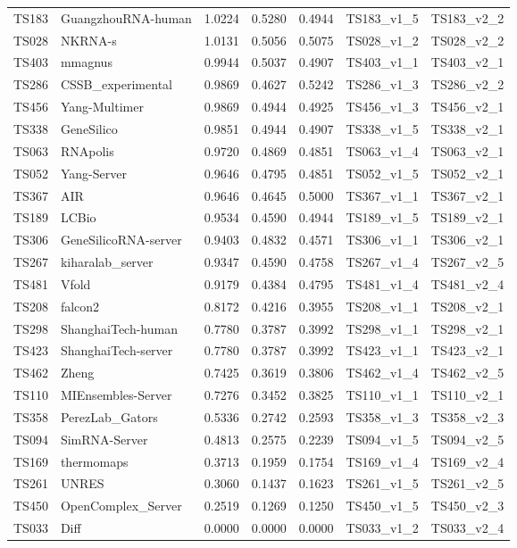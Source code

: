 \begin{table}[ht]
{\begin{tabular}{llrrrll}
TS183 & GuangzhouRNA-human & 1.0224 & 0.5280 & 0.4944 & TS183\_v1\_5 & TS183\_v2\_2 \\ 
TS028 & NKRNA-s & 1.0131 & 0.5056 & 0.5075 & TS028\_v1\_2 & TS028\_v2\_2 \\ 
TS403 & mmagnus & 0.9944 & 0.5037 & 0.4907 & TS403\_v1\_1 & TS403\_v2\_1 \\ 
TS286 & CSSB\_experimental & 0.9869 & 0.4627 & 0.5242 & TS286\_v1\_3 & TS286\_v2\_2 \\ 
TS456 & Yang-Multimer & 0.9869 & 0.4944 & 0.4925 & TS456\_v1\_3 & TS456\_v2\_1 \\ 
TS338 & GeneSilico & 0.9851 & 0.4944 & 0.4907 & TS338\_v1\_5 & TS338\_v2\_1 \\ 
TS063 & RNApolis & 0.9720 & 0.4869 & 0.4851 & TS063\_v1\_4 & TS063\_v2\_1 \\ 
TS052 & Yang-Server & 0.9646 & 0.4795 & 0.4851 & TS052\_v1\_5 & TS052\_v2\_1 \\ 
TS367 & AIR & 0.9646 & 0.4645 & 0.5000 & TS367\_v1\_1 & TS367\_v2\_1 \\ 
TS189 & LCBio & 0.9534 & 0.4590 & 0.4944 & TS189\_v1\_5 & TS189\_v2\_1 \\ 
TS306 & GeneSilicoRNA-server & 0.9403 & 0.4832 & 0.4571 & TS306\_v1\_1 & TS306\_v2\_1 \\ 
TS267 & kiharalab\_server & 0.9347 & 0.4590 & 0.4758 & TS267\_v1\_4 & TS267\_v2\_5 \\ 
TS481 & Vfold & 0.9179 & 0.4384 & 0.4795 & TS481\_v1\_4 & TS481\_v2\_4 \\ 
TS208 & falcon2 & 0.8172 & 0.4216 & 0.3955 & TS208\_v1\_1 & TS208\_v2\_1 \\ 
TS298 & ShanghaiTech-human & 0.7780 & 0.3787 & 0.3992 & TS298\_v1\_1 & TS298\_v2\_1 \\ 
TS423 & ShanghaiTech-server & 0.7780 & 0.3787 & 0.3992 & TS423\_v1\_1 & TS423\_v2\_1 \\ 
TS462 & Zheng & 0.7425 & 0.3619 & 0.3806 & TS462\_v1\_4 & TS462\_v2\_5 \\ 
TS110 & MIEnsembles-Server & 0.7276 & 0.3452 & 0.3825 & TS110\_v1\_1 & TS110\_v2\_1 \\ 
TS358 & PerezLab\_Gators & 0.5336 & 0.2742 & 0.2593 & TS358\_v1\_3 & TS358\_v2\_3 \\ 
TS094 & SimRNA-Server & 0.4813 & 0.2575 & 0.2239 & TS094\_v1\_5 & TS094\_v2\_5 \\ 
TS169 & thermomaps & 0.3713 & 0.1959 & 0.1754 & TS169\_v1\_4 & TS169\_v2\_4 \\ 
TS261 & UNRES & 0.3060 & 0.1437 & 0.1623 & TS261\_v1\_5 & TS261\_v2\_5 \\ 
TS450 & OpenComplex\_Server & 0.2519 & 0.1269 & 0.1250 & TS450\_v1\_5 & TS450\_v2\_3 \\ 
TS033 & Diff & 0.0000 & 0.0000 & 0.0000 & TS033\_v1\_2 & TS033\_v2\_4 \\ 
\bottomrule
\end{tabular}%
}
\end{table}
